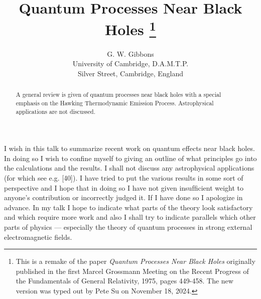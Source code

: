 \usepackage[papersize={6.6in, 10.0in}, left=.5in, right=.5in, top=.6in, bottom=.9in]{geometry}
\linespread{1.05}
\raggedbottom
\pagestyle{plain}
\usepackage{mathpartir}
\usepackage{stmaryrd}
\usepackage{mathtools}
\usepackage{tikz-cd}
\usepackage{microtype}
\usepackage{amssymb}





\usepackage[small]{titlesec}
\usepackage{cite}
\usepackage{upgreek}

\def\Phi{\Upphi}

\title{\large Quantum Processes Near Black Holes%
\footnote{
This is a remake of the paper {\it Quantum Processes Near Black Holes} originally published in the first
Marcel Grossmann Meeting on the Recent Progress of the Fundamentals of General Relativity, 1975, pages 449-458.
The new version was typed out by Pete Su on November 18, 2024.
}}

\author{\normalsize G. W. Gibbons\\
\normalsize University of Cambridge, D.A.M.T.P.\\
\normalsize Silver Street, Cambridge, England}

\date{}

\def\ni{\noindent}
\def\be{\begin{equation}}
\def\ee{\end{equation}}
\def\dt{\, dt}
\def\dphi{\, d\phi}
\def\gtt{g_{tt}}



\maketitle
\thispagestyle{empty}

\begin{abstract}
A general review is given of quantum processes near black holes with
a special emphasis on the Hawking Thermodynamic Emission Process. Astrophysical
applications are not discussed.
\end{abstract}

\bigskip

\ni
I wish in this talk to summarize recent work on quantum effects near
black holes. In doing so I wish to conﬁne myself to giving an outline of what
principles go into the calculations and the results. I shall not discuss any
astrophysical applications
(for which see e.g. [40]). I have tried to put the
various results in some sort of perspective and I hope that in doing so I have not given
insufﬁcient weight to anyone's contribution or incorrectly judged it.
If I have done so I apologize in advance. In my talk I hope to indicate what parts of the
theory look satisfactory and which require more work and also I
shall try to indicate parallels which other parts of physics --- especially
the theory of quantum processes in strong external electromagnetic fields.

